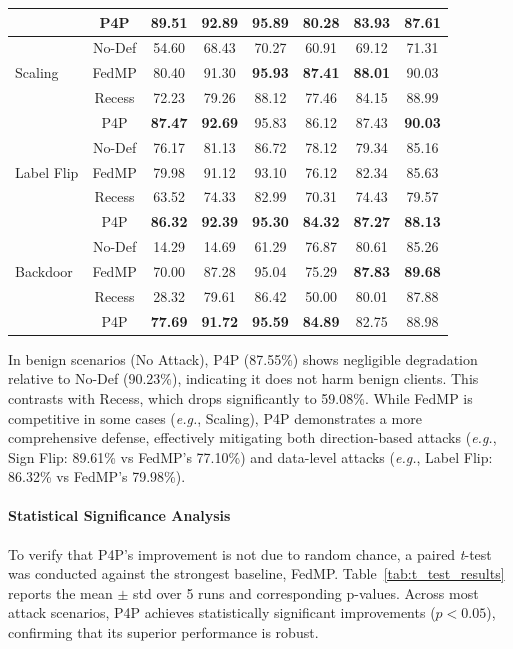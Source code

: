 \begin{table}[h!]
\begin{tabular}{lccccccc}
         & P4P & \textbf{89.51} & \textbf{92.89} & \textbf{95.89} & \textbf{80.28} & \textbf{83.93} & 87.61 \\
        \midrule
        \multirow{3}{*}{Scaling} 
         & No-Def & 54.60 & 68.43 & 70.27 & 60.91 & 69.12 & 71.31 \\
         & FedMP & 80.40 & 91.30 & \textbf{95.93} & \textbf{87.41} & \textbf{88.01} & 90.03 \\
         & Recess & 72.23 & 79.26 & 88.12 & 77.46 & 84.15 & 88.99 \\
         & P4P & \textbf{87.47} & \textbf{92.69} & 95.83 & 86.12 & 87.43 & \textbf{90.03} \\
        \midrule
        \multirow{3}{*}{Label Flip} 
         & No-Def & 76.17 & 81.13 & 86.72 & 78.12 & 79.34 & 85.16 \\
         & FedMP & 79.98 & 91.12 & 93.10 & 76.12 & 82.34 & 85.63 \\
         & Recess & 63.52 & 74.33 & 82.99 & 70.31 & 74.43 & 79.57 \\
         & P4P & \textbf{86.32} & \textbf{92.39} & \textbf{95.30} & \textbf{84.32} & \textbf{87.27} & \textbf{88.13} \\
        \midrule
        \multirow{3}{*}{Backdoor} 
         & No-Def & 14.29 & 14.69 & 61.29 & 76.87 & 80.61 & 85.26 \\
         & FedMP & 70.00 & 87.28 & 95.04 & 75.29 & \textbf{87.83} & \textbf{89.68} \\
         & Recess & 28.32 & 79.61 & 86.42 & 50.00 & 80.01 & 87.88 \\
         & P4P & \textbf{77.69} & \textbf{91.72} & \textbf{95.59} & \textbf{84.89} & 82.75 & 88.98 \\
        \bottomrule
    \end{tabular}
\end{table}

In benign scenarios (No Attack), P4P (87.55\%) shows negligible degradation relative to No-Def (90.23\%), indicating it does not harm benign clients. This contrasts with Recess, which drops significantly to 59.08\%. While FedMP is competitive in some cases (\textit{e.g.}, Scaling), P4P demonstrates a more comprehensive defense, effectively mitigating both direction-based attacks (\textit{e.g.}, Sign Flip: 89.61\% vs FedMP's 77.10\%) and data-level attacks (\textit{e.g.}, Label Flip: 86.32\% vs FedMP's 79.98\%).

\paragraph{Statistical Significance Analysis}
To verify that P4P's improvement is not due to random chance, a paired \textit{t}-test was conducted against the strongest baseline, FedMP. Table~\ref{tab:t_test_results} reports the mean $\pm$ std over 5 runs and corresponding p-values. Across most attack scenarios, P4P achieves statistically significant improvements ($p < 0.05$), confirming that its superior performance is robust.

